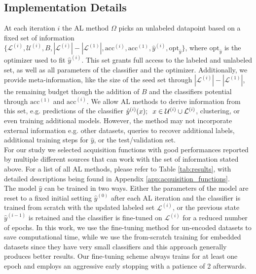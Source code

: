 \documentclass[]{article}
\begin{document}
\subsection{Implementation Details}\label{sec:implementation_details}
At each iteration $i$ the AL method $\Omega$ picks an unlabeled datapoint based on a fixed set of information $\{\mathcal{L}^{(i)}, \mathcal{U}^{(i)}, B, |\mathcal{L}^{(i)}|-|\mathcal{L}^{(1)}|, \text{acc}^{(i)}, \text{acc}^{(1)}, \hat y^{(i)}, \text{opt}_{\hat y}\}$, where $\text{opt}_{\hat y}$ is the optimizer used to fit $\hat y^{(i)}$.
This set grants full access to the labeled and unlabeled set, as well as all parameters of the classifier and the optimizer.
Additionally, we provide meta-information, like the size of the seed set through $|\mathcal{L}^{(i)}|-|\mathcal{L}^{(1)}|$, the remaining budget though the addition of $B$ and the classifiers potential through $\text{acc}^{(1)}$ and $\text{acc}^{(i)}$.
We allow AL methods to derive information from this set, e.g. predictions of the classifier $\hat y^{(i)}(x); \hspace{2mm} x \in \mathcal{U}^{(i)} \cup \mathcal{L}^{(i)}$, clustering, or even training additional models.
However, the method may not incorporate external information e.g. other datasets, queries to recover additional labels, additional training steps for $\hat y$, or the test/validation set. \\
For our study we selected acquisition functions with good performances reported by multiple different sources that can work with the set of information stated above.
For a list of all AL methods, please refer to Table \ref{tab:results}, with detailed descriptions being found in Appendix \ref{app:acquisition_functions}. \\ [1mm]
%
The model $\hat y$ can be trained in two ways. Either the parameters of the model are reset to a fixed initial setting $\hat y^{(0)}$ after each AL iteration and the classifier is trained from scratch with the updated labeled set $\mathcal{L}^{(i)}$, or the previous state $\hat y^{(i-1)}$ is retained and the classifier is fine-tuned on $\mathcal{L}^{(i)}$ for a reduced number of epochs.
In this work, we use the fine-tuning method for un-encoded datasets to save computational time, while we use the from-scratch training for embedded datasets since they have very small classifiers and this approach generally produces better results.
Our fine-tuning scheme always trains for at least one epoch and employs an aggressive early stopping with a patience of 2 afterwards.
\end{document}
